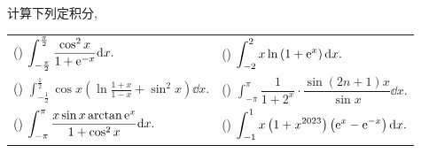 \begin{example}
    计算下列定积分,
    \setcounter{magicrownumbers}{0}
    \begin{table}[H]
        \centering
        \begin{tabular}{l | l}
            (\rownumber{}) $\displaystyle\int_{-\frac{\pi}{2}}^{\frac{\pi}{2}}\frac{\cos^2x}{1+\mathrm{e} ^{-x}}\dd x.$                & (\rownumber{}) $\displaystyle\int_{-2}^2x\ln\left(1+\mathrm{e} ^x\right)\dd x.$                               \\
            (\rownumber{}) $\displaystyle\int_{-\frac{1}{2}}^{\frac{1}{2}}\cos x\left(\ln\frac{1+x}{1-x}+\sin^2x\right)\dd x.$ & (\rownumber{}) $\displaystyle\int_{-\pi}^{\pi}\dfrac{1}{1+2^x}\cdot\dfrac{\sin(2n+1)x}{\sin x}\dd x.$ \\
            (\rownumber{}) $\displaystyle\int_{-\pi}^{\pi}\frac{x\sin x\arctan\mathrm{e} ^x}{1+\cos^2x}\dd x.$                         & (\rownumber{}) $\displaystyle\int_{-1}^1x\left(1+x^{2023}\right)\left(\mathrm{e} ^x-\mathrm{e} ^{-x}\right)\dd x.$
        \end{tabular}
    \end{table}
\end{example}
